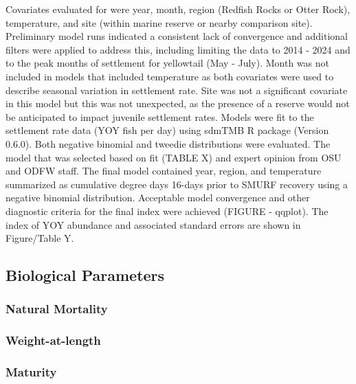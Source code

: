 \documentclass[
]{scrartcl}
\begin{document}
Covariates evaluated for were year, month, region (Redfish Rocks or
Otter Rock), temperature, and site (within marine reserve or nearby
comparison site). Preliminary model runs indicated a consistent lack of
convergence and additional filters were applied to address this,
including limiting the data to 2014 - 2024 and to the peak months of
settlement for yellowtail (May - July). Month was not included in models
that included temperature as both covariates were used to describe
seasonal variation in settlement rate. Site was not a significant
covariate in this model but this was not unexpected, as the presence of
a reserve would not be anticipated to impact juvenile settlement rates.
Models were fit to the settlement rate data (YOY fish per day) using
sdmTMB R package (Version 0.6.0). Both negative binomial and tweedie
distributions were evaluated. The model that was selected based on fit
(TABLE X) and expert opinion from OSU and ODFW staff. The final model
contained year, region, and temperature summarized as cumulative degree
days 16-days prior to SMURF recovery using a negative binomial
distribution. Acceptable model convergence and other diagnostic criteria
for the final index were achieved (FIGURE - qqplot). The index of YOY
abundance and associated standard errors are shown in Figure/Table Y.

\hypertarget{biological-parameters}{%
\subsection{Biological Parameters}\label{biological-parameters}}

\hypertarget{natural-mortality}{%
\subsubsection{Natural Mortality}\label{natural-mortality}}

\hypertarget{weight-at-length}{%
\subsubsection{Weight-at-length}\label{weight-at-length}}

\hypertarget{maturity}{%
\subsubsection{Maturity}\label{maturity}}
\end{document}
